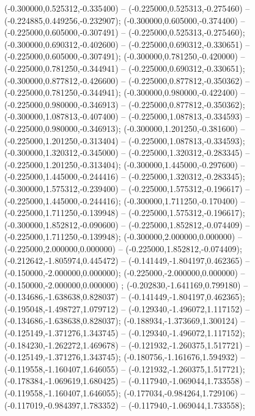  (-0.300000,0.525312,-0.335400) -- (-0.225000,0.525313,-0.275460) -- (-0.224885,0.449256,-0.232907);
 (-0.300000,0.605000,-0.374400) -- (-0.225000,0.605000,-0.307491) -- (-0.225000,0.525313,-0.275460);
 (-0.300000,0.690312,-0.402600) -- (-0.225000,0.690312,-0.330651) -- (-0.225000,0.605000,-0.307491);
 (-0.300000,0.781250,-0.420000) -- (-0.225000,0.781250,-0.344941) -- (-0.225000,0.690312,-0.330651);
 (-0.300000,0.877812,-0.426600) -- (-0.225000,0.877812,-0.350362) -- (-0.225000,0.781250,-0.344941);
 (-0.300000,0.980000,-0.422400) -- (-0.225000,0.980000,-0.346913) -- (-0.225000,0.877812,-0.350362);
 (-0.300000,1.087813,-0.407400) -- (-0.225000,1.087813,-0.334593) -- (-0.225000,0.980000,-0.346913);
 (-0.300000,1.201250,-0.381600) -- (-0.225000,1.201250,-0.313404) -- (-0.225000,1.087813,-0.334593);
 (-0.300000,1.320312,-0.345000) -- (-0.225000,1.320312,-0.283345) -- (-0.225000,1.201250,-0.313404);
 (-0.300000,1.445000,-0.297600) -- (-0.225000,1.445000,-0.244416) -- (-0.225000,1.320312,-0.283345);
 (-0.300000,1.575312,-0.239400) -- (-0.225000,1.575312,-0.196617) -- (-0.225000,1.445000,-0.244416);
 (-0.300000,1.711250,-0.170400) -- (-0.225000,1.711250,-0.139948) -- (-0.225000,1.575312,-0.196617);
 (-0.300000,1.852812,-0.090600) -- (-0.225000,1.852812,-0.074409) -- (-0.225000,1.711250,-0.139948);
 (-0.300000,2.000000,0.000000) -- (-0.225000,2.000000,0.000000) -- (-0.225000,1.852812,-0.074409);
 (-0.212642,-1.805974,0.445472) -- (-0.141449,-1.804197,0.462365) -- (-0.150000,-2.000000,0.000000);
 (-0.225000,-2.000000,0.000000) -- (-0.150000,-2.000000,0.000000) ;
 (-0.202830,-1.641169,0.799180) -- (-0.134686,-1.638638,0.828037) -- (-0.141449,-1.804197,0.462365);
 (-0.195048,-1.498727,1.079712) -- (-0.129340,-1.496072,1.117152) -- (-0.134686,-1.638638,0.828037);
 (-0.188934,-1.373669,1.300124) -- (-0.125149,-1.371276,1.343745) -- (-0.129340,-1.496072,1.117152);
 (-0.184230,-1.262272,1.469678) -- (-0.121932,-1.260375,1.517721) -- (-0.125149,-1.371276,1.343745);
 (-0.180756,-1.161676,1.594932) -- (-0.119558,-1.160407,1.646055) -- (-0.121932,-1.260375,1.517721);
 (-0.178384,-1.069619,1.680425) -- (-0.117940,-1.069044,1.733558) -- (-0.119558,-1.160407,1.646055);
 (-0.177034,-0.984264,1.729106) -- (-0.117019,-0.984397,1.783352) -- (-0.117940,-1.069044,1.733558);
